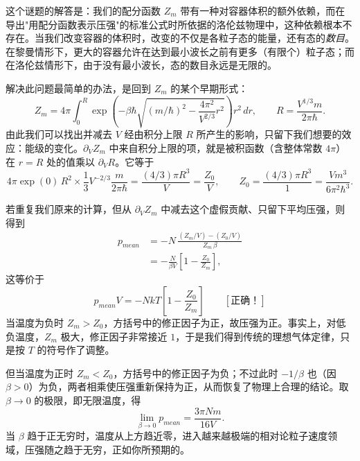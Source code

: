 这个谜题的解答是：我们的配分函数 $Z_{m}$ 带有一种对容器体积的额外依赖，而在导出"用配分函数表示压强"的标准公式时所依据的洛伦兹物理中，这种依赖根本不存在。当我们改变容器的体积时，改变的不仅是各粒子态的能量，还有态的\emph{数目}。在黎曼情形下，更大的容器允许在达到最小波长之前有更多（有限个）粒子态；而在洛伦兹情形下，由于没有最小波长，态的数目永远是无限的。

解决此问题最简单的办法，是回到 $Z_{m}$ 的某个早期形式：
\begin{equation}
Z_{m}=4\pi\int_{0}^{R}
\exp\!\left(-\beta\hbar\sqrt{(m/\hbar)^{2}-\frac{4\pi^{2}}{V^{2/3}}r^{2}}\right)r^{2}\,dr,
\qquad R=\frac{V^{1/3}m}{2\pi\hbar}.
\end{equation}
由此我们可以找出并减去 $V$ 经由积分上限 $R$ 所产生的影响，只留下我们想要的效应：能级的变化。$\partial_{V}Z_{m}$ 中来自积分上限的项，就是被积函数（含整体常数 $4\pi$）在 $r=R$ 处的值乘以 $\partial_{V}R$。它等于
\begin{equation}
4\pi\exp(0)\,R^{2}\times\frac13 V^{-2/3}\frac{m}{2\pi\hbar}
=\frac{(4/3)\pi R^{3}}{V}
=\frac{Z_{0}}{V},
\qquad Z_{0}=\frac{(4/3)\pi R^{3}}{1}=\frac{Vm^{3}}{6\pi^{2}\hbar^{3}}.
\end{equation}


若重复我们原来的计算，但从 $\partial_{V}Z_{m}$ 中减去这个虚假贡献、只留下平均压强，则得到
\begin{align}
p_{mean}
&=-N\,\frac{(Z_{m}/V)-(Z_{0}/V)}{Z_{m}\,\beta} \nonumber\\
&=-\frac{N}{\beta V}\left[1-\frac{Z_{0}}{Z_{m}}\right],
\end{align}
这等价于
\begin{equation}
p_{mean}V=-NkT\left[1-\frac{Z_{0}}{Z_{m}}\right]\qquad[\text{正确！}]
\end{equation}
当温度为负时 $Z_{m}>Z_{0}$，方括号中的修正因子为正，故压强为正。事实上，对低负温度，$Z_{m}$ 极大，修正因子非常接近 $1$，于是我们得到传统的理想气体定律，只是按 $T$ 的符号作了调整。

但当温度为正时 $Z_{m}<Z_{0}$，方括号中的修正因子为负；不过此时 $-1/\beta$ 也（因 $\beta>0$）为负，两者相乘使压强重新保持为正，从而恢复了物理上合理的结论。取 $\beta\to0$ 的极限，即无限温度，得
\begin{equation}
\lim_{\beta\to0}p_{mean}=\frac{3\pi Nm}{16V}.
\end{equation}
当 $\beta$ 趋于正无穷时，温度从上方趋近零，进入越来越极端的相对论粒子速度领域，压强随之趋于无穷，正如你所预期的。

